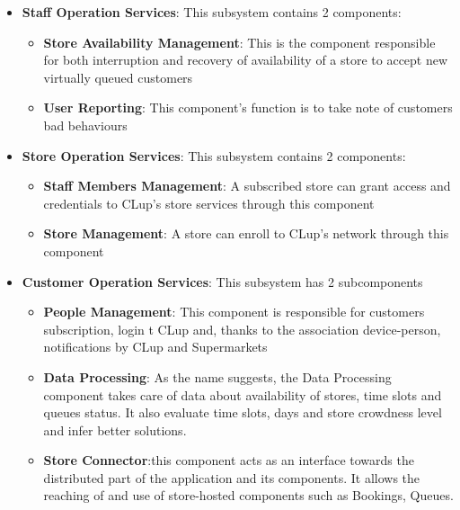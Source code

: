 \begin{itemize}
	\item \textbf{Staff Operation Services}: This subsystem contains 2 components:
	\begin{itemize}
		\item \textbf{Store Availability Management}: This is the component responsible for both interruption and recovery of availability of a store to accept new virtually queued customers
		\item \textbf{User Reporting}: This component's function is to take note of customers bad behaviours 
	\end{itemize} 

	\item \textbf{Store Operation Services}: This subsystem contains 2 components:
	\begin{itemize}
		\item \textbf{Staff Members Management}: A subscribed store can grant access and credentials to CLup's store services through this component 
		\item \textbf{Store Management}: A store can enroll to CLup's network through this component
	\end{itemize} 

	\item \textbf{Customer Operation Services}: This subsystem has 2 subcomponents
	\begin{itemize}
		\item \textbf{People Management}: This component is responsible for customers subscription, login t CLup and, thanks to the association device-person, notifications by CLup and Supermarkets
		\item \textbf{Data Processing}: As the name suggests, the Data Processing component takes care of data about availability of stores, time slots and queues status. It also evaluate time slots, days and store crowdness level and infer better solutions.
		\item \textbf{Store Connector}:this component acts as an interface towards the distributed part of the application and its components. It allows the reaching of and use of store-hosted components such as Bookings, Queues.
	\end{itemize}


\end{itemize}
